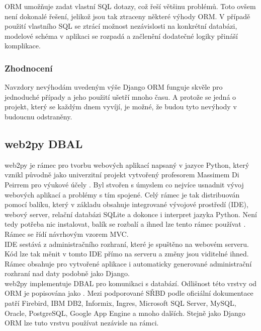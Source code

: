 \documentclass[ing,male,java,dept456]{diploma}						%
\begin{document}
ORM umožňuje zadat vlastní SQL dotazy, což řeší většinu problémů. Toto ovšem není dokonalé řešení, jelikož jsou tak ztraceny některé výhody ORM. V případě použití vlastního SQL se ztrácí možnost nezávislosti na konkrétní databázi, modelové schéma v aplikaci se rozpadá a začlenění dodatečné logiky přináší komplikace. \\

\subsubsection{Zhodnocení}
Navzdory nevýhodám uvedeným výše Django ORM funguje skvěle pro jednoduché případy a jeho použití ušetří mnoho času. A protože se jedná o projekt, který se každým dnem vyvíjí, je možné, že budou tyto nevýhody v budoucnu odstraněny.

\clearpage

\subsection{web2py DBAL}

web2py je rámec pro tvorbu webových aplikací napsaný v jazyce Python, který vznikl původně jako univerzitní projekt vytvořený profesorem Massimem Di Peirrem pro výukové účely \cite{wikiw2p}. Byl stvořen s úmyslem co nejvíce usnadnit vývoj webových aplikací a problémy s tím spojené. Celý rámec je tak distribuován pomocí balíku, který v základu obsahuje integrované vývojové prostředí (IDE), webový server, relační databázi SQLite a dokonce i interpret jazyka Python. Není tedy potřeba nic instalovat, balík se rozbalí a ihned lze tento rámec používat \cite{web2py}. Rámec se řídí návrhovým vzorem MVC. \\
IDE sestává z administračního rozhraní, které je spuštěno na webovém serveru. Kód lze tak měnit v tomto IDE přímo na serveru a změny jsou viditelné ihned. Rámec obsahuje pro vytvořené aplikace i automaticky generované administrační rozhraní nad daty podobně jako Django. \\
web2py implementuje DBAL pro komunikaci s databází. Odlišnost této vrstvy od ORM je popisována jako  \cite{wikiw2p}. Mezi podporované SŘBD podle oficiální dokumentace patří Firebird, IBM DB2, Informix, Ingres, Microsoft SQL Server, MySQL, Oracle, PostgreSQL, Google App Engine a mnoho dalších. Stejně jako Django ORM lze tuto vrstvu používat nezávisle na rámci.
\end{document}

